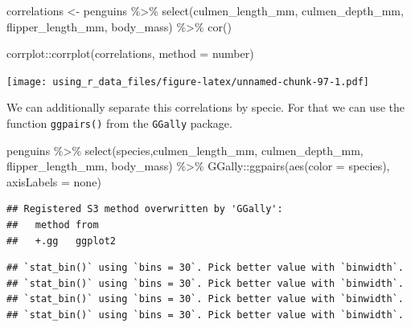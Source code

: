 \documentclass[
]{book}
\newenvironment{Shaded}{\begin{snugshade}}{\end{snugshade}}
\newcommand{\AttributeTok}[1]{\textcolor[rgb]{0.77,0.63,0.00}{#1}}
\newcommand{\FunctionTok}[1]{\textcolor[rgb]{0.00,0.00,0.00}{#1}}
\newcommand{\NormalTok}[1]{#1}
\newcommand{\OtherTok}[1]{\textcolor[rgb]{0.56,0.35,0.01}{#1}}
\newcommand{\SpecialCharTok}[1]{\textcolor[rgb]{0.00,0.00,0.00}{#1}}
\newcommand{\StringTok}[1]{\textcolor[rgb]{0.31,0.60,0.02}{#1}}
\begin{document}
\begin{Shaded}
\begin{Highlighting}[]
\NormalTok{correlations }\OtherTok{\textless{}{-}}\NormalTok{ penguins }\SpecialCharTok{\%\textgreater{}\%} 
  \FunctionTok{select}\NormalTok{(}\StringTok{\textquotesingle{}culmen\_length\_mm\textquotesingle{}}\NormalTok{, }\StringTok{\textquotesingle{}culmen\_depth\_mm\textquotesingle{}}\NormalTok{, }\StringTok{\textquotesingle{}flipper\_length\_mm\textquotesingle{}}\NormalTok{, }\StringTok{\textquotesingle{}body\_mass\textquotesingle{}}\NormalTok{) }\SpecialCharTok{\%\textgreater{}\%} 
  \FunctionTok{cor}\NormalTok{()}

\NormalTok{corrplot}\SpecialCharTok{::}\FunctionTok{corrplot}\NormalTok{(correlations, }\AttributeTok{method =} \StringTok{\textquotesingle{}number\textquotesingle{}}\NormalTok{)}
\end{Highlighting}
\end{Shaded}

\texttt{[image: using\_r\_data\_files/figure-latex/unnamed-chunk-97-1.pdf]}

We can additionally separate this correlations by specie.
For that we can use the function \texttt{ggpairs()} from the \texttt{GGally} package.

\begin{Shaded}
\begin{Highlighting}[]
\NormalTok{penguins }\SpecialCharTok{\%\textgreater{}\%} 
  \FunctionTok{select}\NormalTok{(}\StringTok{\textquotesingle{}species\textquotesingle{}}\NormalTok{,}\StringTok{\textquotesingle{}culmen\_length\_mm\textquotesingle{}}\NormalTok{, }\StringTok{\textquotesingle{}culmen\_depth\_mm\textquotesingle{}}\NormalTok{, }\StringTok{\textquotesingle{}flipper\_length\_mm\textquotesingle{}}\NormalTok{, }\StringTok{\textquotesingle{}body\_mass\textquotesingle{}}\NormalTok{) }\SpecialCharTok{\%\textgreater{}\%} 
\NormalTok{  GGally}\SpecialCharTok{::}\FunctionTok{ggpairs}\NormalTok{(}\FunctionTok{aes}\NormalTok{(}\AttributeTok{color =}\NormalTok{ species), }\AttributeTok{axisLabels =} \StringTok{\textquotesingle{}none\textquotesingle{}}\NormalTok{)}
\end{Highlighting}
\end{Shaded}

\begin{verbatim}
## Registered S3 method overwritten by 'GGally':
##   method from   
##   +.gg   ggplot2
\end{verbatim}

\begin{verbatim}
## `stat_bin()` using `bins = 30`. Pick better value with `binwidth`.
## `stat_bin()` using `bins = 30`. Pick better value with `binwidth`.
## `stat_bin()` using `bins = 30`. Pick better value with `binwidth`.
## `stat_bin()` using `bins = 30`. Pick better value with `binwidth`.
\end{verbatim}
\end{document}
